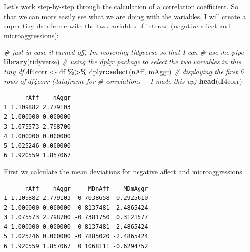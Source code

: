 \documentclass[
  11pt,
]{book}
\newenvironment{Shaded}{\begin{snugshade}}{\end{snugshade}}
\newcommand{\CommentTok}[1]{\textcolor[rgb]{0.37,0.37,0.37}{\textit{#1}}}
\newcommand{\FunctionTok}[1]{\textcolor[rgb]{0.27,0.27,0.27}{\textbf{#1}}}
\newcommand{\NormalTok}[1]{#1}
\newcommand{\OtherTok}[1]{\textcolor[rgb]{0.37,0.37,0.37}{#1}}
\newcommand{\SpecialCharTok}[1]{\textcolor[rgb]{0.43,0.43,0.43}{\textbf{#1}}}
\begin{document}
Let's work step-by-step through the calculation of a correlation coefficient. So that we can more easily see what we are doing with the variables, I will create a super tiny dataframe with the two variables of interest (negative affect and microaggressions):

\begin{Shaded}
\begin{Highlighting}[]
\CommentTok{\# just in case it turned off, I\textquotesingle{}m reopening tidyverse so that I can}
\CommentTok{\# use the pipe}
\FunctionTok{library}\NormalTok{(tidyverse)}
\CommentTok{\# using the dplyr package to select the two variables in this tiny df}
\NormalTok{df4corr }\OtherTok{\textless{}{-}}\NormalTok{ df }\SpecialCharTok{\%\textgreater{}\%}
\NormalTok{    dplyr}\SpecialCharTok{::}\FunctionTok{select}\NormalTok{(nAff, mAggr)}
\CommentTok{\# displaying the first 6 rows of df4corr (\textquotesingle{}dataframe for}
\CommentTok{\# correlations\textquotesingle{} {-}{-} I made this up)}
\FunctionTok{head}\NormalTok{(df4corr)}
\end{Highlighting}
\end{Shaded}

\begin{verbatim}
      nAff    mAggr
1 1.109882 2.779103
2 1.000000 0.000000
3 1.075573 2.798700
4 1.000000 0.000000
5 1.025246 0.000000
6 1.920559 1.857067
\end{verbatim}

First we calculate the mean deviations for negative affect and microaggressions.

\begin{Shaded}
\end{Shaded}

\begin{verbatim}
      nAff    mAggr     MDnAff    MDmAggr
1 1.109882 2.779103 -0.7038658  0.2925610
2 1.000000 0.000000 -0.8137481 -2.4865424
3 1.075573 2.798700 -0.7381750  0.3121577
4 1.000000 0.000000 -0.8137481 -2.4865424
5 1.025246 0.000000 -0.7885020 -2.4865424
6 1.920559 1.857067  0.1068111 -0.6294752
\end{verbatim}
\end{document}
